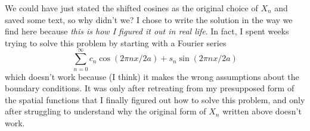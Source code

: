 We could have just stated the shifted cosines as the original choice of $X_n$ and saved some text, so why didn't we?
I chose to write the solution in the way we find here because \emph{this is how I figured it out in real life}.
In fact, I spent weeks trying to solve this problem by starting with a Fourier series
\begin{equation*}
  \sum_{n=0}^\infty c_n \cos(2 \pi n x / 2 a) + s_n \sin(2 \pi n x / 2 a)
\end{equation*}
which doesn't work because (I think) it makes the wrong assumptions about the boundary conditions.
It was only after retreating from my presupposed form of the spatial functions that I finally figured out how to solve this problem, and only after struggling to understand why the original form of $X_n$ written above doesn't work.

